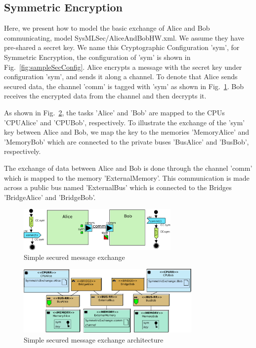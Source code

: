 \documentclass{llncs}
\begin{document}
\subsection{Symmetric Encryption}
\label{sec:symenc}

Here, we present how to model the basic exchange of Alice and Bob communicating, model SysMLSec/AliceAndBobHW.xml. We assume they have
pre-shared a secret key. We name this Cryptographic Configuration 'sym', for
Symmetric Encryption, the configuration of 'sym' is shown in Fig.~\ref{fig:sampleSecConfig}. Alice encrypts a message with the secret key under
configuration 'sym', and sends it along a channel. To denote that Alice sends
secured data, the channel 'comm' is tagged with 'sym' as shown in
Fig.~\ref{fig:sampleComp}.
Bob receives the encrypted data from the channel and then decrypts it.

As shown in Fig.~\ref{fig:sampleArch}, the tasks 'Alice' and 'Bob' are mapped to the CPUs 'CPUAlice' and 'CPUBob', respectively.
To illustrate the exchange of the 'sym' key between Alice and Bob, we map the key to the memories 'MemoryAlice' and 'MemoryBob' which are connected to the private buses 'BusAlice' and 'BusBob', respectively. 

The exchange of data between Alice and Bob is done through the channel 'comm' which is mapped to the memory 'ExternalMemory'.
This communication is made across a public bus named 'ExternalBus' which is connected to the Bridges 'BridgeAlice' and 'BridgeBob'.

\begin{figure}[htbp]
	\centering	\includegraphics[width=0.7\textwidth]{figures/securityStuff/sampleComp.pdf}
	\caption{Simple secured message exchange}
	\label{fig:sampleComp}
\end{figure}

\begin{figure}[htbp]
	\centering	\includegraphics[width=0.8\textwidth]{figures/securityStuff/arch_alice_bob_sym.pdf}
	\caption{Simple secured message exchange architecture}
	\label{fig:sampleArch}
\end{figure}
\end{document}
